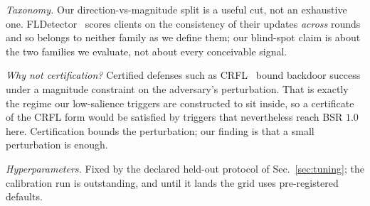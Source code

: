 \emph{Taxonomy.} Our direction-vs-magnitude split is a useful cut, not an
exhaustive one. FLDetector~\cite{zhang2022fldetector} scores clients on the
consistency of their updates \emph{across} rounds and so belongs to neither
family as we define them; our blind-spot claim is about the two families we
evaluate, not about every conceivable signal.

\emph{Why not certification?} Certified defenses such as CRFL~\cite{xie2021crfl}
bound backdoor success under a magnitude constraint on the adversary's
perturbation. That is exactly the regime our low-salience triggers are
constructed to sit inside, so a certificate of the CRFL form would be satisfied
by triggers that nevertheless reach BSR $1.0$ here. Certification bounds the
perturbation; our finding is that a small perturbation is enough.

\emph{Hyperparameters.} Fixed by the declared held-out protocol of
Sec.~\ref{sec:tuning}; the calibration run is outstanding, and until it lands the
grid uses pre-registered defaults.
